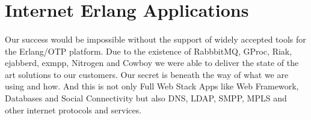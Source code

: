 \documentclass[11pt]{article}
\begin{document}


\section*{Internet Erlang Applications}
\paragraph{}
Our success would be impossible without the support of widely accepted tools
for the Erlang/OTP platform. Due to the existence of RabbbitMQ, GProc, Riak,
ejabberd, exmpp, Nitrogen and Cowboy we were able to deliver the state
of the art solutions to our customers. Our secret is beneath the way of
what we are using and how. And this is not only Full Web Stack Apps like Web Framework,
Databases and Social Connectivity but also DNS, LDAP, SMPP, MPLS and other internet
protocols and services.



\end{document}
